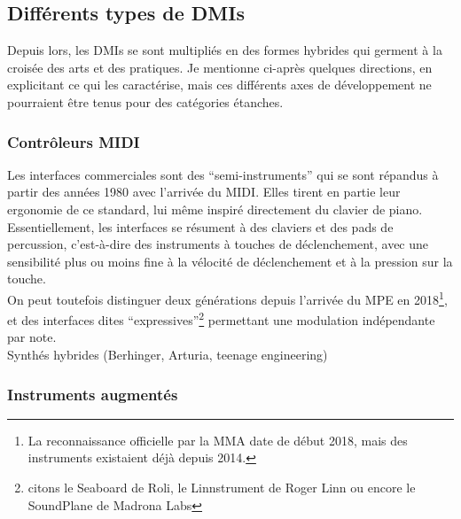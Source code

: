 \subsection{Différents types de DMIs}

\noindent Depuis lors, les \glspl{DMI} se sont multipliés en des formes hybrides qui germent à la croisée des arts et des pratiques. Je mentionne ci-après quelques directions, en explicitant ce qui les caractérise, mais ces différents axes de développement ne pourraient être tenus pour des catégories étanches.

\subsubsection{Contrôleurs MIDI}

\noindent Les interfaces commerciales sont des ``semi-instruments'' qui se sont répandus à partir des années 1980 avec l'arrivée du \gls{MIDI}. Elles tirent en partie leur ergonomie de ce standard, lui même inspiré directement du clavier de piano. Essentiellement, les interfaces se résument à des claviers et des pads de percussion, c'est-à-dire des instruments à touches de déclenchement, avec une sensibilité plus ou moins fine à la vélocité de déclenchement et à la pression sur la touche.\\
\indent On peut toutefois distinguer deux générations depuis l'arrivée du \gls{MPE} en 2018\footnote{La reconnaissance officielle par la \gls{MMA} date de début 2018, mais des instruments existaient déjà depuis 2014.}, et des interfaces dites ``expressives''\footnote{citons le Seaboard de Roli, le Linnstrument de Roger Linn ou encore le SoundPlane de Madrona Labs} permettant une modulation indépendante par note.\\
Synthés hybrides (Berhinger, Arturia, teenage engineering)

\subsubsection{Instruments augmentés}

